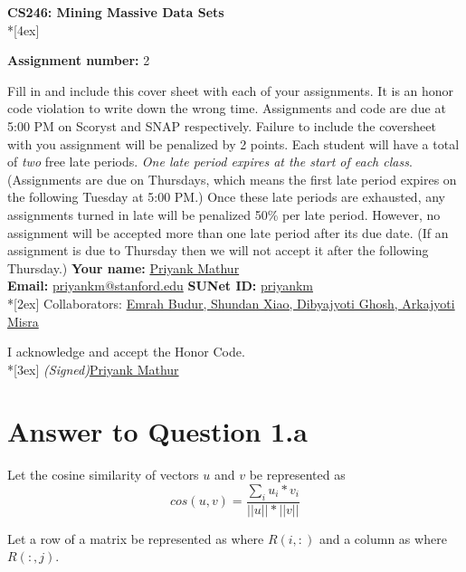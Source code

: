 \documentclass[11pt]{article}
\begin{document}
\thispagestyle{empty}
\parindent 0pt
\vfill
\large

\begin{center}
\LARGE{\bf \textsf{CS246: Mining Massive Data Sets}} \\*[4ex]
\end{center}

{\Large
\textbf{Assignment number:} 2
\vfill
\vfill

Fill in and include this cover sheet with each of your assignments. It is an honor code
violation to write down the wrong time. Assignments and code are due at 5:00 PM on Scoryst and SNAP respectively. Failure to include the coversheet with you assignment will
be penalized by 2 points.
Each student will have a total of \textit{two} free late periods. \textit{One late period expires at the start of
each class}. (Assignments are due on Thursdays, which means the first late period expires on
the following Tuesday at 5:00 PM.) Once these late periods are exhausted, any assignments
turned in late will be penalized 50\% per late period. However, no assignment will be accepted
more than one late period after its due date. (If an assignment is due to Thursday then we
will not accept it after the following Thursday.)
\vfill
\vfill
{\Large
\textbf{Your name:} \underline{Priyank Mathur} \\
\textbf{Email:} \underline{priyankm@stanford.edu} \textbf{SUNet ID:} \underline{priyankm}\\*[2ex] }
Collaborators: \underline{Emrah Budur, Shundan Xiao, Dibyajyoti Ghosh, Arkajyoti Misra} \\
\vfill

\vfill

I acknowledge and accept the Honor Code.\\*[3ex]
\bigskip
\textit{(Signed)}\underline{Priyank Mathur}

\vfill
\vfill

\pagebreak[4]
\section*{Answer to Question 1.a}

Let the cosine similarity of vectors $u$ and $v$ be represented as 
$$ cos(u, v) = \frac{ \sum_{i} u_i * v_i }{||u|| * ||v||} $$

Let a row of a matrix be represented as where $R(i, :)$ and a column as where $R(:, j)$.\\

}
\end{document}
